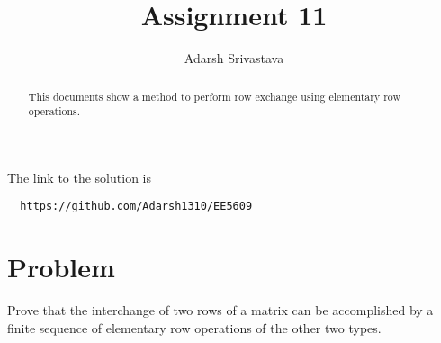 \documentclass[journal,12pt,twocolumn]{IEEEtran}
\begin{document}
      \def\rightbox#1{\makebox[0in][r]{#1}}
      \def\centbox#1{\makebox[0in]{#1}}
      \def\topbox#1{\raisebox{-\baselineskip}[0in][0in]{#1}}
      \def\midbox#1{\raisebox{-0.5\baselineskip}[0in][0in]{#1}}
 \vspace{3cm}
 \title{Assignment 11}
 \author{Adarsh Srivastava}
 \maketitle
 \newpage
 \bigskip
 \renewcommand{\thetable}{\theenumi}
 The link to the solution is
 \begin{lstlisting}
  https://github.com/Adarsh1310/EE5609
 \end{lstlisting}
 \begin{abstract}
 This documents show a method to perform row exchange using elementary row operations.
 \end{abstract}
  \section{\textbf{Problem}}
Prove that the interchange of two rows of a matrix can be accomplished by a finite sequence of elementary row operations of the other two types.
\end{document}
